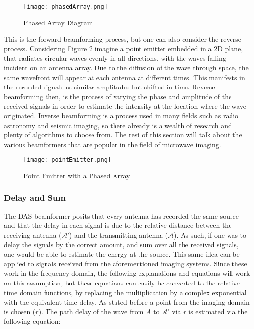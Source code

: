 \begin{figure}[!h]
    \texttt{[image: phasedArray.png]}
    \centering
    \caption{Phased Array Diagram}
    \label{fig:phasedArray}
\end{figure}

This is the forward beamforming process, but one can also consider the reverse process. Considering Figure
\ref{fig:pointEmitter} imagine a point emitter embedded in a 2D plane, that radiates circular waves evenly in all
directions, with the waves falling incident on an antenna array. Due to the diffusion of the wave through space, the
same wavefront will appear at each antenna at different times. This manifests in the recorded signals as similar
amplitudes but shifted in time. Reverse beamforming then, is the process of varying the phase and amplitude of the
received signals in order to estimate the intensity at the location where the wave originated. Inverse beamforming is a
process used in many fields such as radio astronomy and seismic imaging, so there already is a wealth of research and
plenty of algorithms to choose from. The rest of this section will talk about the various beamformers that are popular
in the field of microwave imaging. \hfill \break

\begin{figure}
    \texttt{[image: pointEmitter.png]}
    \centering
    \caption{Point Emitter with a Phased Array}
    \label{fig:pointEmitter}
\end{figure}

\subsubsection{Delay and Sum}
The DAS beamformer posits that every antenna has recorded the same source and that the delay in each signal is due to
the relative distance between the receiving antenna ($\mathcal{A}'$) and the transmitting antenna ($\mathcal{A}$). As
such, if one was to delay the signals by the correct amount, and sum over all the received signals, one would be able to
estimate the energy at the source. This same idea can be applied to signals received from the aforementioned imaging
systems. Since these work in the frequency domain, the following explanations and equations will work on this
assumption, but these equations can easily be converted to the relative time domain functions, by replacing the
multiplication by a complex exponential with the equivalent time delay. As stated before a point from the imaging domain
is chosen ($r$). The path delay of the wave from $A$ to $\mathcal{A'}$ via $r$ is estimated via the following equation:

